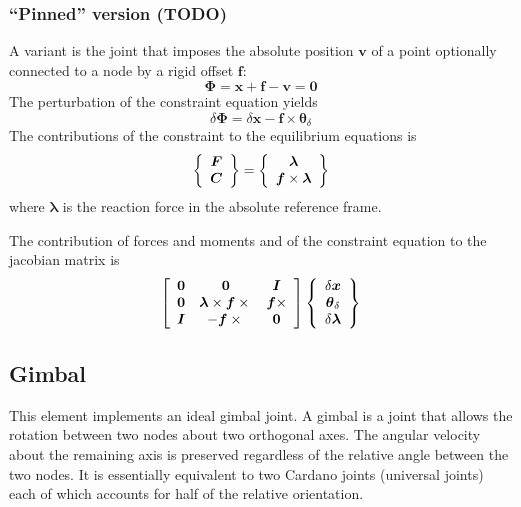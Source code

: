 \documentclass[10pt,dvips]{report}
\newcommand{\T}[1]{\boldsymbol{#1}}
\begin{document}
\subsubsection{``Pinned'' version (TODO)}
A variant is the joint that imposes the absolute position $\T{v}$ of a point
optionally connected to a node by a rigid offset $\T{f}$:
\begin{equation}
		\T{\Phi} = \T{x} + \T{f} - \T{v} = \T{0}
\end{equation}
The perturbation of the constraint equation yields
\begin{equation}
	\delta\T{\Phi} = 
	\delta\T{x} - \T{f}\times \T{\theta}_{\delta}
\end{equation}
The contributions of the constraint to the equilibrium equations is
\begin{equation}
	\cubr{\cvvect{
		\T{F} \\
		\T{C}
	}} = \cubr{\cvvect{
		\T{\lambda} \\
		\T{f}\times \T{\lambda}
	}}
\end{equation}
where $\T{\lambda}$ is the reaction force in the absolute reference frame.

The contribution of forces and moments and of the constraint equation 
to the jacobian matrix is
\begin{equation*}
	\sqbr{\matr{ccc}{
		\T{0} &
			\T{0} &
			\T{I} \\
		\T{0} &
			\T{\lambda}\times\T{f}\times{} &
			\T{f}\times \\
		\T{I} &
			- \T{f}\times{} &
			\T{0}
	}}\cubr{\cvvect{
		\delta\T{x} \\
		\T{\theta}_{\delta} \\
		\delta\T{\lambda}
	}}
\end{equation*}










\subsection{Gimbal}
This element implements an ideal gimbal joint.
A gimbal is a joint that allows the rotation between two nodes
about two orthogonal axes.
The angular velocity about the remaining axis is preserved regardless
of the relative angle between the two nodes.
It is essentially equivalent to two Cardano joints (universal joints)
each of which accounts for half of the relative orientation.
\end{document}
